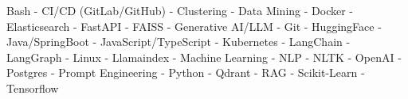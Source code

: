 \small{
Bash -
CI/CD (GitLab/GitHub) -
Clustering -
Data Mining -
Docker -
Elasticsearch -
FastAPI -
FAISS -
Generative AI/LLM -
Git -
HuggingFace -
Java/SpringBoot -
JavaScript/TypeScript -
Kubernetes -
LangChain -
LangGraph -
Linux -
Llamaindex -
Machine Learning -
NLP -
NLTK -
OpenAI -
Postgres -
Prompt Engineering -
Python -
Qdrant -
RAG -
Scikit-Learn -
Tensorflow
}